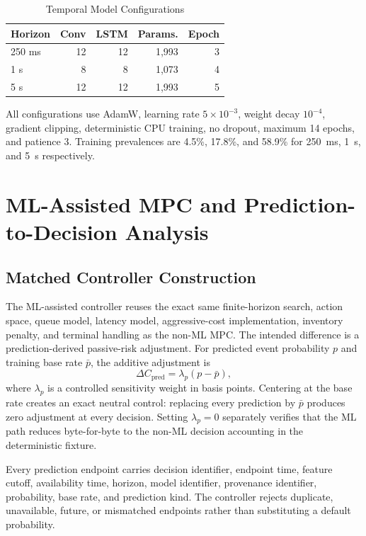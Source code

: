 \documentclass[journal,10pt]{IEEEtran}
\newcommand{\1}{\mathbf{1}}
\begin{document}
\begin{table}[t]
\centering
\caption{Temporal Model Configurations}
\label{tab:temporal-config}
\begin{tabular}{lrrrr}
\toprule
Horizon & Conv & LSTM & Params. & Epoch \\
\midrule
250 ms & 12 & 12 & 1,993 & 3 \\
1 s    & 8  & 8  & 1,073 & 4 \\
5 s    & 12 & 12 & 1,993 & 5 \\
\bottomrule
\end{tabular}
\end{table}
All configurations use AdamW, learning rate $5\times10^{-3}$, weight decay $10^{-4}$, gradient clipping, deterministic CPU training, no dropout, maximum 14 epochs, and patience 3. Training prevalences are 4.5\%, 17.8\%, and 58.9\% for 250~ms, 1~s, and 5~s respectively.

\section{ML-Assisted MPC and Prediction-to-Decision Analysis}
\label{sec:mlmpc}
\subsection{Matched Controller Construction}
The ML-assisted controller reuses the exact same finite-horizon search, action space, queue model, latency model, aggressive-cost implementation, inventory penalty, and terminal handling as the non-ML MPC. The intended difference is a prediction-derived passive-risk adjustment. For predicted event probability $p$ and training base rate $\bar p$, the additive adjustment is
\begin{equation}
\Delta C_{\mathrm{pred}} = \lambda_p(p-\bar p),
\label{eq:prediction-term}
\end{equation}
where $\lambda_p$ is a controlled sensitivity weight in basis points. Centering at the base rate creates an exact neutral control: replacing every prediction by $\bar p$ produces zero adjustment at every decision. Setting $\lambda_p=0$ separately verifies that the ML path reduces byte-for-byte to the non-ML decision accounting in the deterministic fixture.

Every prediction endpoint carries decision identifier, endpoint time, feature cutoff, availability time, horizon, model identifier, provenance identifier, probability, base rate, and prediction kind. The controller rejects duplicate, unavailable, future, or mismatched endpoints rather than substituting a default probability.
\end{document}
